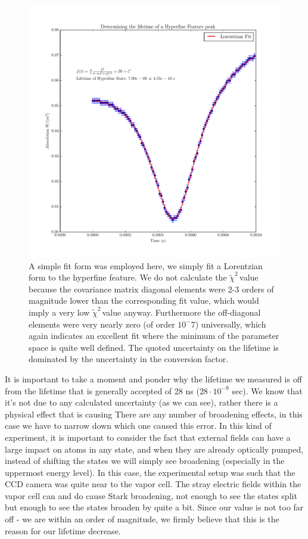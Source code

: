 \documentclass{article}
\newcommand{\redchi}{$\tilde{\chi}^2\,$}
\begin{document}
  \hspace{.25cm}

  \begin{figure}[!htb]
    \centering
    \includegraphics[scale=.75]{../plots/rb87_hyperfine.pdf}
    \caption{A simple fit form was employed here, we simply fit a Lorentzian form to the hyperfine feature.  We do not calculate the \redchi value because the covariance matrix diagonal elements were 2-3 orders of magnitude lower than the corresponding fit value, which would imply a very low \redchi value anyway.  Furthermore the off-diagonal elements were very nearly zero (of order $10^-7$) universally, which again indicates an excellent fit where the minimum of the parameter space is quite well defined.  The quoted uncertainty on the lifetime is dominated by the uncertainty in the conversion factor.}
    \label{lifetime}
  \end{figure}

  It is important to take a moment and ponder why the lifetime we measured is off from the lifetime that is generally accepted of 28 ns ($28\cdot10^{-9}$ sec).  We know that it's not due to any calculated uncertainty (as we can see), rather there is a physical effect that is causing   There are any number of broadening effects, in this case we have to narrow down which one caused this error.  In this kind of experiment, it is important to consider the fact that external fields can have a large impact on atoms in any state, and when they are already optically pumped, instead of shifting the states we will simply see broadening (especially in the uppermost energy level).  In this case, the experimental setup was such that the CCD camera was quite near to the vapor cell.  The stray electric fields within the vapor cell can and do cause Stark broadening, not enough to see the states split but enough to see the states broaden by quite a bit.  Since our value is not too far off - we are within an order of magnitude, we firmly believe that this is the reason for our lifetime decrease.
\end{document}
